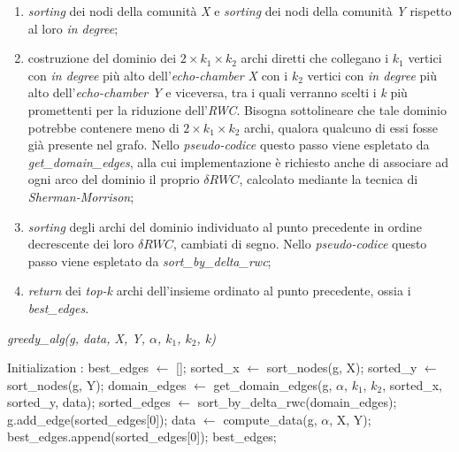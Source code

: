\begin{enumerate}
\item \textit{sorting} dei nodi della comunità \textit{X} e \textit{sorting} dei nodi della comunità \textit{Y} rispetto al loro \textit{in degree};
\item costruzione del dominio dei \textit{$2 \times k_1 \times k_2$} archi diretti che collegano i \textit{$k_1$} vertici con \textit{in degree} più alto dell'\textit{echo-chamber X} con i \textit{$k_2$} vertici con \textit{in degree} più alto dell'\textit{echo-chamber Y} e viceversa, tra i quali verranno scelti i \textit{k} più promettenti per la riduzione dell'\textit{RWC}. Bisogna sottolineare che tale dominio potrebbe contenere meno di  \textit{$2 \times k_1 \times k_2$} archi, qualora qualcuno di essi fosse già presente nel grafo. Nello \textit{pseudo-codice} questo passo viene espletato da \textit{get\_domain\_edges}, alla cui implementazione è richiesto anche di associare ad ogni arco del dominio il proprio \textit{$\delta RWC$}, calcolato mediante la tecnica di \textit{Sherman-Morrison};
\item \textit{sorting} degli archi del dominio individuato al punto precedente in ordine decrescente dei loro \textit{$\delta RWC$}, cambiati di segno. Nello \textit{pseudo-codice} questo passo viene espletato da \textit{sort\_by\_delta\_rwc};
\item \textit{return} dei \textit{top-k} archi dell'insieme ordinato al punto precedente, ossia i \textit{best\_edges}.
\end{enumerate}

\begin{algorithm}
\caption{\textit{greedy\_alg(g, data, X, Y, $\alpha$, $k_1$, $k_2$, k)}}
\begin{algorithmic} 
\STATE Initialization : best\_edges $\leftarrow$ [];
\STATE sorted\_x $\leftarrow$ sort\_nodes(g, X); 
\STATE sorted\_y $\leftarrow$ sort\_nodes(g, Y);
\STATE domain\_edges $\leftarrow$ get\_domain\_edges(g, $\alpha$, $k_1$, $k_2$, sorted\_x, sorted\_y, data);
\STATE sorted\_edges $\leftarrow$ sort\_by\_delta\_rwc(domain\_edges);
\STATE g.add\_edge(sorted\_edges[0]);
\STATE data $\leftarrow$ compute\_data(g, $\alpha$, X, Y);
\STATE best\_edges.append(sorted\_edges[0]);
\ENDFOR
\RETURN best\_edges;
\end{algorithmic}
\end{algorithm}

